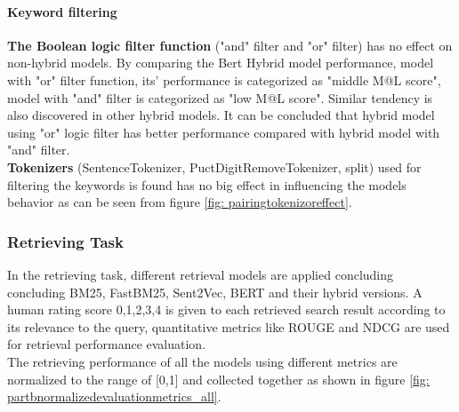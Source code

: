 \paragraph{Keyword filtering} %

\textbf{The Boolean logic filter function} ("and" filter and "or" filter) has no effect on non-hybrid models.
By comparing the Bert Hybrid model performance, model with "or" filter function, its' performance is categorized as "middle M@L score", model with "and" filter is categorized as "low M@L score". Similar tendency is also discovered in other hybrid models. It can be concluded that hybrid model using "or" logic filter has better performance compared with hybrid model with "and" filter.\\

\textbf{Tokenizers} (SentenceTokenizer,  PuctDigitRemoveTokenizer, split) used for filtering the keywords is found has no big effect in influencing the models behavior as can be seen from figure \ref{fig: pairingtokenizoreffect}.					


\subsubsection{Retrieving Task}
In the retrieving task, different retrieval models are applied concluding concluding BM25, FastBM25, Sent2Vec, BERT and their hybrid versions.
A human rating score {0,1,2,3,4} is given to each retrieved search result according to its relevance to the query, quantitative metrics like ROUGE and NDCG are used for retrieval performance evaluation.\\

The retrieving performance of all the models using different metrics are normalized to the range of [0,1] and collected together as shown in figure \ref{fig: partbnormalizedevaluationmetrics_all}.

